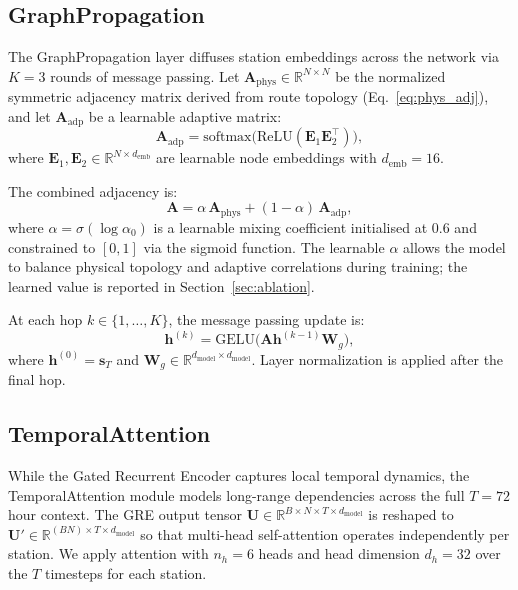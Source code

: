 \subsection{GraphPropagation}

The GraphPropagation layer diffuses station embeddings across the network via $K = 3$ rounds of message passing. Let $\mathbf{A}_{\text{phys}} \in \mathbb{R}^{N \times N}$ be the normalized symmetric adjacency matrix derived from route topology (Eq.~\ref{eq:phys_adj}), and let $\mathbf{A}_{\text{adp}}$ be a learnable adaptive matrix:
\begin{equation}
    \mathbf{A}_{\text{adp}} = \text{softmax}\bigl(\text{ReLU}(\mathbf{E}_1 \mathbf{E}_2^\top)\bigr),
    \label{eq:adaptive}
\end{equation}
where $\mathbf{E}_1, \mathbf{E}_2 \in \mathbb{R}^{N \times d_{\text{emb}}}$ are learnable node embeddings with $d_{\text{emb}} = 16$.

The combined adjacency is:
\begin{equation}
    \mathbf{A} = \alpha \, \mathbf{A}_{\text{phys}} + (1 - \alpha) \, \mathbf{A}_{\text{adp}},
    \label{eq:combined}
\end{equation}
where $\alpha = \sigma(\log \alpha_0)$ is a learnable mixing coefficient initialised at $0.6$ and constrained to $[0, 1]$ via the sigmoid function. The learnable $\alpha$ allows the model to balance physical topology and adaptive correlations during training; the learned value is reported in Section~\ref{sec:ablation}.

At each hop $k \in \{1, \dots, K\}$, the message passing update is:
\begin{equation}
    \mathbf{h}^{(k)} = \text{GELU}\bigl(\mathbf{A} \mathbf{h}^{(k-1)} \mathbf{W}_g\bigr),
    \label{eq:graph}
\end{equation}
where $\mathbf{h}^{(0)} = \mathbf{s}_T$ and $\mathbf{W}_g \in \mathbb{R}^{d_{\text{model}} \times d_{\text{model}}}$. Layer normalization is applied after the final hop.

\subsection{TemporalAttention}

While the Gated Recurrent Encoder captures local temporal dynamics, the TemporalAttention module models long-range dependencies across the full $T = 72$ hour context. The GRE output tensor $\mathbf{U} \in \mathbb{R}^{B \times N \times T \times d_{\text{model}}}$ is reshaped to $\mathbf{U}' \in \mathbb{R}^{(BN) \times T \times d_{\text{model}}}$ so that multi-head self-attention operates independently per station. We apply attention with $n_h = 6$ heads and head dimension $d_h = 32$ over the $T$ timesteps for each station.

